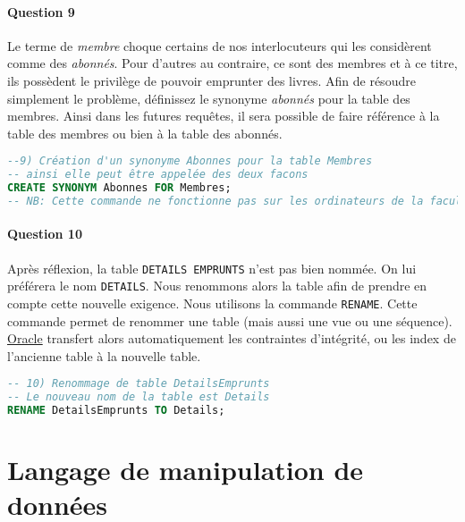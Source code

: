 \documentclass[10pt, oneside]{article}
\begin{document}

\paragraph{Question 9} Le terme de \textit{membre} choque certains de nos interlocuteurs qui les considèrent comme des \textit{abonnés}. Pour d'autres au contraire, ce sont des membres et à ce titre, ils possèdent le privilège de pouvoir emprunter des livres. Afin de résoudre simplement le problème, définissez le synonyme \textit{abonnés} pour la table des membres. Ainsi dans les futures requêtes, il sera possible de faire référence à la table des membres ou bien à la table des abonnés.

\begin{lstlisting}[language=sql, title=Question 9, label=QI9]
--9) Création d'un synonyme Abonnes pour la table Membres
-- ainsi elle peut être appelée des deux facons
CREATE SYNONYM Abonnes FOR Membres;
-- NB: Cette commande ne fonctionne pas sur les ordinateurs de la faculté car on ne possède pas les bons privilèges
\end{lstlisting}


\paragraph{Question 10} Après réflexion, la table \texttt{DETAILS EMPRUNTS} n'est pas bien nommée. On lui préférera le nom \texttt{DETAILS}. Nous renommons alors la table afin de prendre en compte cette nouvelle exigence. Nous utilisons la commande \texttt{RENAME}. Cette commande permet de renommer une table (mais aussi une vue ou une séquence). \href{http://www.oracle.com}{Oracle} transfert alors automatiquement les contraintes d'intégrité, ou les index de l'ancienne table à la nouvelle table.

\begin{lstlisting}[language=sql, title=Question 10, label=QI10]
-- 10) Renommage de table DetailsEmprunts
-- Le nouveau nom de la table est Details
RENAME DetailsEmprunts TO Details;
\end{lstlisting}


\section{Langage de manipulation de données}
\end{document}
